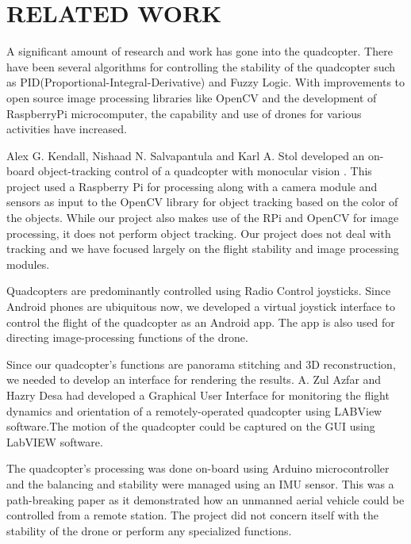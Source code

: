 \chapter{RELATED WORK} %
A significant amount of research and work has gone into the quadcopter. There have been several algorithms for controlling the stability of the quadcopter such as PID(Proportional-Integral-Derivative) and Fuzzy Logic. With improvements to open source image processing libraries like OpenCV and the development of RaspberryPi microcomputer, the capability and use of drones for various activities have increased.
\par
 Alex G. Kendall, Nishaad N. Salvapantula and Karl A. Stol developed an on-board object-tracking control of a quadcopter with monocular vision \cite{kendall2014board}. This project used a Raspberry Pi for processing along with a camera module and sensors as input to the OpenCV library for object tracking based on the color of the objects.
 \newline
  While our project also makes use of the RPi and OpenCV for image processing, it does not perform object tracking. Our project does not deal with tracking and we have focused largely on the flight stability and image processing modules.
\par
Quadcopters are predominantly controlled using Radio Control joysticks. Since Android phones are ubiquitous now, we developed a virtual joystick interface to control the flight of the quadcopter as an Android app. The app is also used for directing image-processing functions of the drone.
\newline 
\newline 
\par
Since our quadcopter's functions are panorama stitching and 3D reconstruction, we needed to develop an interface for rendering the results.  A. Zul Azfar and Hazry Desa \cite{azfar2011simple} had developed a Graphical User Interface for monitoring the flight dynamics and orientation of a remotely-operated quadcopter using LABView software.The motion of the quadcopter could be captured on the GUI using LabVIEW software. 
\par
The quadcopter’s processing was done on-board using Arduino microcontroller and the balancing and stability were managed using an IMU sensor. This was a path-breaking paper as it demonstrated how an unmanned aerial vehicle could be controlled from a remote station. The project did not concern itself with the stability of the drone or perform any specialized functions.
